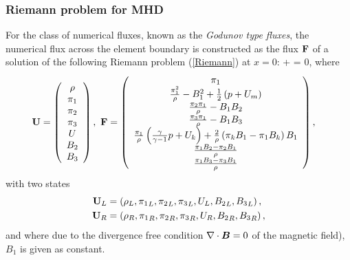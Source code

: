 \subsubsection{Riemann problem for MHD}
For the class of numerical fluxes, known as the \textit{Godunov type fluxes}, the numerical flux across the element boundary is constructed as the flux $\mathrm{\mathbf{F}}$ of a solution of the following Riemann problem (\cref{Riemann}) at $x = 0$:
\be
\label{Riemann}
 +  = 0,
\ee
where
\begin{align}
\label{RiemannUDef}
\mathrm{\mathbf{U}} & =  \left(\begin{array}{c}\rho \\ \pi_1 \\ \pi_2 \\ \pi_3 \\ U \\ B_2 \\ B_3 \\ \end{array}\right),\ \mathrm{\mathbf{F}} = \left(\begin{array}{c} \pi_1 \\ \frac{\pi_1^2}{\rho} - B_1^2 + \frac12\left( p + U_m\right) \\ \frac{\pi_2 \pi_1}{\rho} - B_1 B_2 \\ \frac{\pi_3 \pi_1}{\rho} - B_1 B_3\\ \frac{\pi_1}{\rho} \left( \frac{\gamma}{\gamma - 1} p + U_k\right) + \frac{2}{\rho} \left( \pi_k B_1 - \pi_1 B_k\right) B_1  \\ \frac{\pi_1 B_2 - \pi_2 B_1}{\rho} \\ \frac{\pi_1 B_3 - \pi_3 B_1}{\rho} \\ \end{array}\right),
\end{align}
with two states
\begin{align}
\mathrm{\mathbf{U}}_L & =  \left(\rho_L, {\pi_1}_L, {\pi_2}_L, {\pi_3}_L, {U}_L, {B_2}_L, {B_3}_L \right),\\
\mathrm{\mathbf{U}}_R & =  \left(\rho_R, {\pi_1}_R, {\pi_2}_R, {\pi_3}_R, {U}_R, {B_2}_R, {B_3}_R \right),
\end{align}
and where due to the divergence free condition $\nabla\cdot \mbox{\boldmath $B$} = 0$ of the magnetic field), $B_1$ is given as constant.
